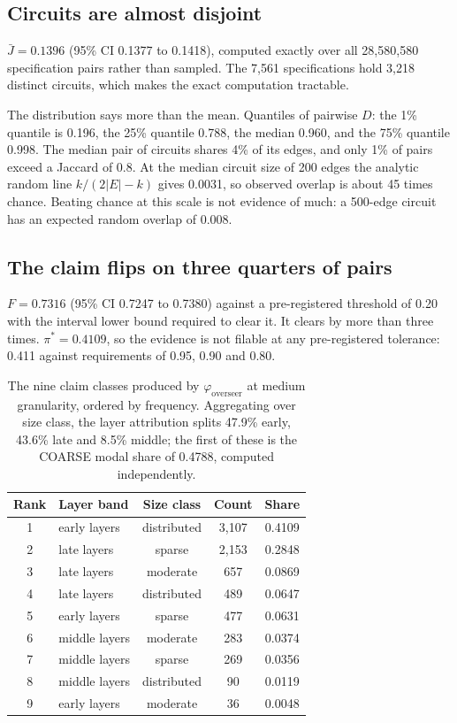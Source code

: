 \documentclass[11pt]{article}
\begin{document}
\subsection{Circuits are almost disjoint}

$\bar{J} = 0.1396$ (95\% CI 0.1377 to 0.1418), computed exactly over all
28{,}580{,}580 specification pairs rather than sampled. The 7{,}561
specifications hold 3{,}218 distinct circuits, which makes the exact computation
tractable.

The distribution says more than the mean. Quantiles of pairwise $D$: the 1\%
quantile is 0.196, the 25\% quantile 0.788, the median 0.960, and the 75\%
quantile 0.998. The median pair of circuits shares 4\% of its edges, and only 1\%
of pairs exceed a Jaccard of 0.8. At the median circuit size of 200 edges the
analytic random line $k/(2|E|-k)$ gives 0.0031, so observed overlap is about 45
times chance. Beating chance at this scale is not evidence of much: a 500-edge
circuit has an expected random overlap of 0.008.

\subsection{The claim flips on three quarters of pairs}

$F = 0.7316$ (95\% CI 0.7247 to 0.7380) against a pre-registered threshold of 0.20
with the interval lower bound required to clear it. It clears by more than three
times. $\pi^{*} = 0.4109$, so the evidence is not filable at any pre-registered
tolerance: 0.411 against requirements of 0.95, 0.90 and 0.80.

\begin{table}[htbp]
\centering
\caption{The nine claim classes produced by $\varphi_{\text{overseer}}$ at medium
granularity, ordered by frequency. Aggregating over size class, the layer
attribution splits 47.9\% early, 43.6\% late and 8.5\% middle; the first of these
is the COARSE modal share of 0.4788, computed independently.}
\label{tab:classes}
\begin{tabular}{clccc}
\toprule
Rank & Layer band & Size class & Count & Share \\
\midrule
1 & early layers & distributed & 3,107 & 0.4109 \\
2 & late layers & sparse & 2,153 & 0.2848 \\
3 & late layers & moderate & 657 & 0.0869 \\
4 & late layers & distributed & 489 & 0.0647 \\
5 & early layers & sparse & 477 & 0.0631 \\
6 & middle layers & moderate & 283 & 0.0374 \\
7 & middle layers & sparse & 269 & 0.0356 \\
8 & middle layers & distributed & 90 & 0.0119 \\
9 & early layers & moderate & 36 & 0.0048 \\
\bottomrule
\end{tabular}
\end{table}
\end{document}
